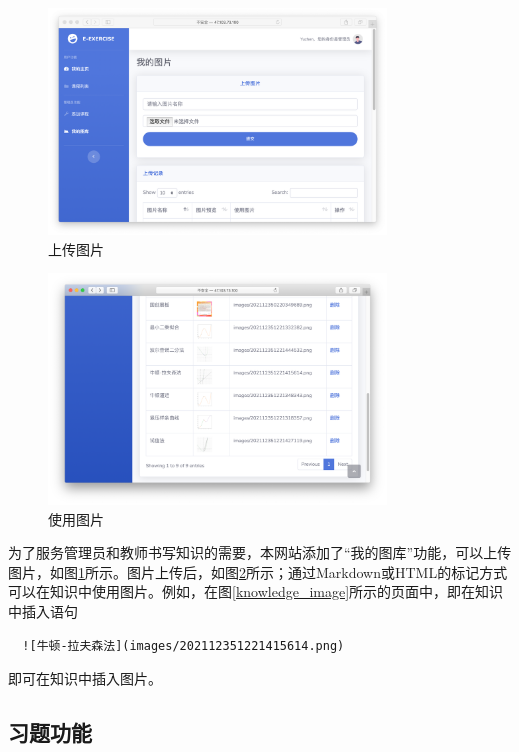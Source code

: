 \documentclass{nwafucoursepaper}
\begin{document}
\begin{figure}[htp]
  \centering
  \includegraphics[width=0.8\textwidth]{add_image.png}
  \caption{上传图片}
  \label{add_image}
\end{figure}

\begin{figure}[htp]
  \centering
  \includegraphics[width=0.8\textwidth]{use_image.png}
  \caption{使用图片}
  \label{use_image}
\end{figure}

为了服务管理员和教师书写知识的需要，本网站添加了“我的图库”功能，可以上传图片，如图\ref{add_image}所示。图片上传后，如图\ref{use_image}所示；通过Markdown或HTML的标记方式可以在知识中使用图片。例如，在图\ref{knowledge_image}所示的页面中，即在知识中插入语句
\begin{lstlisting}
  ![牛顿-拉夫森法](images/202112351221415614.png)
\end{lstlisting}
即可在知识中插入图片。

\newpage

\subsection{习题功能}
\end{document}
